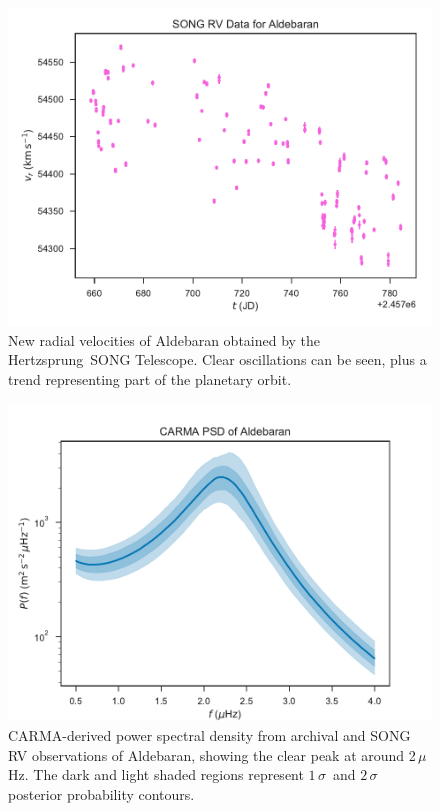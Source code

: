 \documentclass[modern]{aastex61}
\newcommand{\muHz}{\mbox{$\mu$Hz}\xspace}
\begin{document}
\begin{figure}
\centering
\includegraphics[width=\textwidth]{song-data.pdf}
\caption{New radial velocities of Aldebaran obtained by the Hertzsprung~SONG Telescope. Clear oscillations can be seen, plus a trend representing part of the planetary orbit.}
\label{songdata}
\end{figure}


\begin{figure}
\centering
\includegraphics[width=\textwidth]{psd-zoom.pdf}
\caption{CARMA-derived power spectral density from archival and SONG RV observations of Aldebaran, showing the clear peak at around 2\,\muHz. The dark and light shaded regions represent $1\,\sigma$~and $2\,\sigma$ posterior probability contours. }
\label{psd}
\end{figure}
\end{document}
